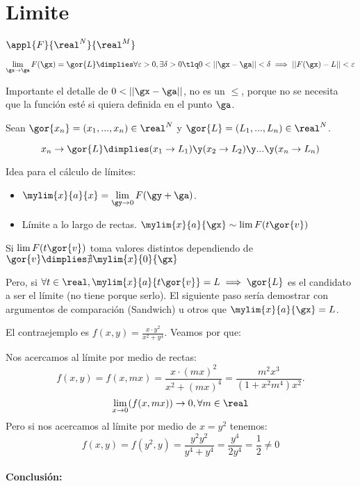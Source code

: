 \documentclass{apuntes}
\begin{document}
 \section{Limite}
 $\appl{F}{\real^N}{\real^M}$
 \begin{defn}[Límite]
  $$\lim_{\gx \rightarrow \ga} F(\gx) = \gor{L} \dimplies \forall \varepsilon > 0,  \exists \delta>0 \tlq 0<||\gx-\ga|| <\delta \implies ||F(\gx) - L||<\varepsilon$$
 \end{defn}
 Importante el detalle de $0 < ||\gx-\ga||$, no es un $\leq$, porque no se necesita que la función esté si quiera definida en el punto $\ga$.  
 
 \begin{theorem}
  
  Sean $\gor{x_n} = (x_1,...,x_n) \in \real^N$ y $\gor{L} = (L_1,...,L_n) \in \real^N$.
 
  $$x_n \rightarrow \gor{L} \dimplies (x_1 \rightarrow L_1) \y (x_2 \rightarrow L_2) \y ... \y (x_n \rightarrow L_n)$$
 \end{theorem}
 
 Idea para el cálculo de límites: 
 \begin{itemize}
  \item $\displaystyle\mylim{x}{a}{x} = \lim_{\gy\rightarrow 0} F(\gy+\ga)$.
  \item Límite a lo largo de rectas. $\displaystyle\mylim{x}{a}{\gx} \sim \lim F({t\gor{v}})$
 
 \end{itemize}
 
 Si $\displaystyle\lim F({t\gor{v}})$ toma valores distintos dependiendo de $\gor{v} \dimplies \nexists \displaystyle\mylim{x}{0}{\gx}$
 
 Pero, si $\forall t \in \real, \mylim{x}{a}{t\gor{v}} = L \implies \gor{L}$ es el candidato a ser el límite (no tiene porque serlo). El siguiente paso sería demostrar con argumentos de comparación (Sandwich) u otros que $\mylim{x}{a}{\gx} = L$.
 
 El contraejemplo es $f(x,y) = \frac{x\cdot y^2}{x^2 + y^4}$. Veamos por que:
 
 Nos acercamos al límite por medio de rectas:
 $$f(x,y) = f(x,mx) = \frac{x\cdot(mx)^2}{x^2 + (mx)^4} = \frac{m^2x^3}{(1 + x^2m^4)x^2}.$$
 $$\displaystyle\lim_{x\rightarrow 0} (f(x,mx)) \rightarrow 0, \forall m \in \real$$
 Pero si nos acercamos al límite por medio de $x = y^2$ tenemos:
 $$f(x,y) = f(y^2,y) = \frac{y^2y^2}{y^4+y^4} = \frac{y^4}{2y^4} = \frac{1}{2}\neq 0$$
 \paragraph{Conclusión:}
 
\end{document}

